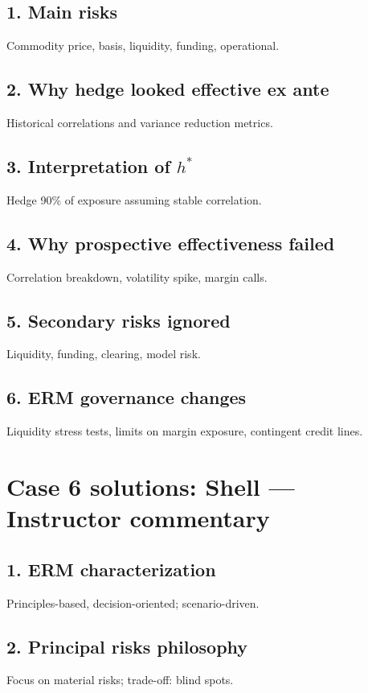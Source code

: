\documentclass[11pt]{article}
\begin{document}
\subsection*{1. Main risks}
Commodity price, basis, liquidity, funding, operational.

\subsection*{2. Why hedge looked effective ex ante}
Historical correlations and variance reduction metrics.

\subsection*{3. Interpretation of $h^*$}
Hedge 90\% of exposure assuming stable correlation.

\subsection*{4. Why prospective effectiveness failed}
Correlation breakdown, volatility spike, margin calls.

\subsection*{5. Secondary risks ignored}
Liquidity, funding, clearing, model risk.

\subsection*{6. ERM governance changes}
Liquidity stress tests, limits on margin exposure, contingent credit lines.

\newpage
\section{Case 6 solutions: Shell --- Instructor commentary}
\subsection*{1. ERM characterization}
Principles-based, decision-oriented; scenario-driven.

\subsection*{2. Principal risks philosophy}
Focus on material risks; trade-off: blind spots.
\end{document}
